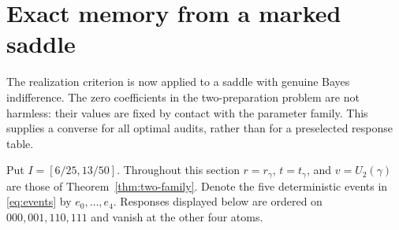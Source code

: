 \section{Exact memory from a marked saddle}
\label{sec:exact-memory}
The realization criterion is now applied to a saddle with genuine Bayes
indifference. The zero coefficients in the two-preparation problem are
not harmless: their values are fixed by contact with the parameter
family. This supplies a converse for all optimal audits, rather than
for a preselected response table.

Put $I=[6/25,13/50]$. Throughout this section $r=r_\gamma$,
$t=t_\gamma$, and $v=U_2(\gamma)$ are those of
Theorem~\ref{thm:two-family}. Denote the five deterministic events in
\eqref{eq:events} by $e_0,\ldots,e_4$. Responses displayed below are
ordered on $000,001,110,111$ and vanish at the other four atoms.

